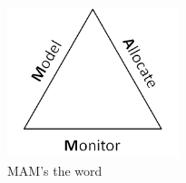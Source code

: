 \begin{figure}[!ht]
\centering
\includegraphics[scale=0.3,width=5cm]{mam.png}
\caption[MAM's the word]{MAM's the word}\label{fig:mam}
\end{figure}
